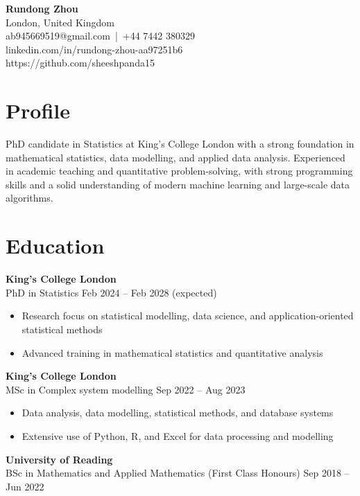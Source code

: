 \documentclass[11pt,a4paper]{article}
\begin{document}
\begin{center}
{\LARGE \textbf{Rundong Zhou}} \\[-2pt]
London, United Kingdom \\[-2pt]
{ab945669519@gmail.com} \,|\, +44 7442 380329 \\[-2pt]
{linkedin.com/in/rundong-zhou-aa97251b6}\\[-2pt]
{https://github.com/sheeshpanda15}
\end{center}

\vspace{0.3cm}

\section*{Profile}
PhD candidate in Statistics at King’s College London with a strong foundation in mathematical statistics,
data modelling, and applied data analysis. Experienced in academic teaching and quantitative problem-solving,
with strong programming skills and a solid understanding of modern machine learning and large-scale data algorithms.

\section*{Education}

\quad \textbf{King’s College London} \\
PhD in Statistics \hfill Feb 2024 -- Feb 2028 (expected)
\begin{itemize}
\item Research focus on statistical modelling, data science, and application-oriented statistical methods
\item Advanced training in mathematical statistics and quantitative analysis
\end{itemize}

\textbf{King’s College London} \\
MSc in Complex system modelling \hfill Sep 2022 -- Aug 2023
\begin{itemize}
\item Data analysis, data modelling, statistical methods, and database systems
\item Extensive use of Python, R, and Excel for data processing and modelling
\end{itemize}

\textbf{University of Reading} \\
BSc in Mathematics and Applied Mathematics (First Class Honours) \hfill Sep 2018 -- Jun 2022
\end{document}
